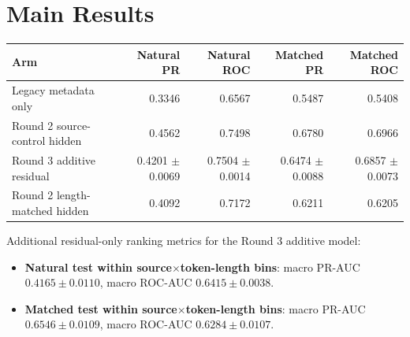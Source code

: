 \documentclass[11pt]{article}
\begin{document}
\section*{Main Results}
\begin{center}
\small
\setlength{\tabcolsep}{4pt}
\begin{tabular}{@{}p{3.1cm}rrrr@{}}
\toprule
Arm & Natural PR & Natural ROC & Matched PR & Matched ROC \\
\midrule
Legacy metadata only & 0.3346 & 0.6567 & 0.5487 & 0.5408 \\
Round 2 source-control hidden & 0.4562 & 0.7498 & 0.6780 & 0.6966 \\
Round 3 additive residual & 0.4201 $\pm$ 0.0069 & 0.7504 $\pm$ 0.0014 & 0.6474 $\pm$ 0.0088 & 0.6857 $\pm$ 0.0073 \\
Round 2 length-matched hidden & 0.4092 & 0.7172 & 0.6211 & 0.6205 \\
\bottomrule
\end{tabular}
\end{center}

Additional residual-only ranking metrics for the Round 3 additive model:
\begin{itemize}
  \item \textbf{Natural test within source$\times$token-length bins}: macro PR-AUC $0.4165 \pm 0.0110$, macro ROC-AUC $0.6415 \pm 0.0038$.
  \item \textbf{Matched test within source$\times$token-length bins}: macro PR-AUC $0.6546 \pm 0.0109$, macro ROC-AUC $0.6284 \pm 0.0107$.
\end{itemize}
\end{document}
